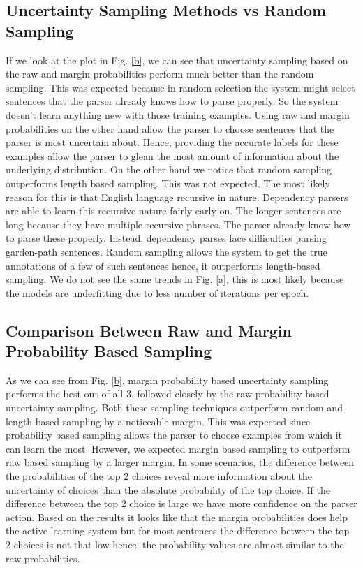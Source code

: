 \documentclass[11pt,letterpaper]{article}
\begin{document}
\subsection{Uncertainty Sampling Methods vs Random Sampling}
If we look at the plot in Fig. \ref{b}, we can see that uncertainty sampling based on the raw and margin probabilities perform much better than the random sampling. This was expected because in random selection the system might select sentences that the parser already knows how to parse properly. So the system doesn't learn anything new with those training examples. Using raw and margin probabilities on the other hand allow the parser to choose sentences that the parser is most uncertain about. Hence, providing the accurate labels for these examples allow the parser to glean the most amount of information about the underlying distribution. On the other hand we notice that random sampling outperforms length based sampling. This was not expected. The most likely reason for this is that English language recursive in nature. Dependency parsers are able to learn this recursive nature fairly early on. The longer sentences are long because they have multiple recursive phrases. The parser already know how to parse these properly. Instead, dependency parses face difficulties parsing garden-path sentences. Random sampling allows the system to get the true annotations of a few of such sentences hence, it outperforms length-based sampling. We do not see the same trends in Fig. \ref{a}, this is most likely because the models are underfitting due to less number of iterations per epoch.

\subsection{Comparison Between Raw and Margin Probability Based Sampling}
As we can see from Fig. \ref{b}, margin probability based uncertainty sampling performs the best out of all 3, followed closely by the raw probability based uncertainty sampling. Both these sampling techniques outperform random and length based sampling by a noticeable margin. This was expected since probability based sampling allows the parser to choose examples from which it can learn the most. However, we expected margin based sampling to outperform raw based sampling by a larger margin. In some scenarios, the difference between the probabilities of the top 2 choices reveal more information about the uncertainty of choices than the absolute probability of the top choice. If the difference between the top 2 choice is large we have more confidence on the parser action. Based on the results it looks like that the margin probabilities does help the active learning system but for most sentences the difference between the top 2 choices is not that low hence, the probability values are almost similar to the raw probabilities.
\end{document}
